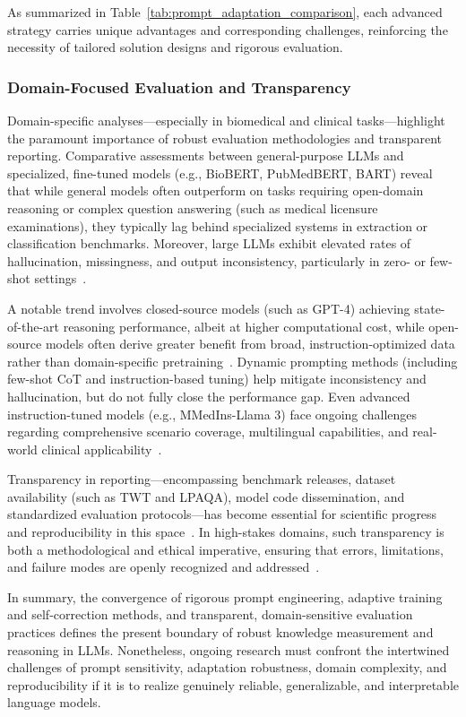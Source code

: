 \documentclass[sigconf]{acmart}
\begin{document}
As summarized in Table~\ref{tab:prompt_adaptation_comparison}, each advanced strategy carries unique advantages and corresponding challenges, reinforcing the necessity of tailored solution designs and rigorous evaluation.

\subsubsection{Domain-Focused Evaluation and Transparency}

Domain-specific analyses---especially in biomedical and clinical tasks---highlight the paramount importance of robust evaluation methodologies and transparent reporting. Comparative assessments between general-purpose LLMs and specialized, fine-tuned models (e.g., BioBERT, PubMedBERT, BART) reveal that while general models often outperform on tasks requiring open-domain reasoning or complex question answering (such as medical licensure examinations), they typically lag behind specialized systems in extraction or classification benchmarks. Moreover, large LLMs exhibit elevated rates of hallucination, missingness, and output inconsistency, particularly in zero- or few-shot settings~\cite{ref94,ref95}.

A notable trend involves closed-source models (such as GPT-4) achieving state-of-the-art reasoning performance, albeit at higher computational cost, while open-source models often derive greater benefit from broad, instruction-optimized data rather than domain-specific pretraining~\cite{ref94}. Dynamic prompting methods (including few-shot CoT and instruction-based tuning) help mitigate inconsistency and hallucination, but do not fully close the performance gap. Even advanced instruction-tuned models (e.g., MMedIns-Llama 3) face ongoing challenges regarding comprehensive scenario coverage, multilingual capabilities, and real-world clinical applicability~\cite{ref95}.

Transparency in reporting---encompassing benchmark releases, dataset availability (such as TWT and LPAQA), model code dissemination, and standardized evaluation protocols---has become essential for scientific progress and reproducibility in this space~\cite{ref96,ref98,ref95}. In high-stakes domains, such transparency is both a methodological and ethical imperative, ensuring that errors, limitations, and failure modes are openly recognized and addressed~\cite{ref94,ref95,ref96,ref98}.

In summary, the convergence of rigorous prompt engineering, adaptive training and self-correction methods, and transparent, domain-sensitive evaluation practices defines the present boundary of robust knowledge measurement and reasoning in LLMs. Nonetheless, ongoing research must confront the intertwined challenges of prompt sensitivity, adaptation robustness, domain complexity, and reproducibility if it is to realize genuinely reliable, generalizable, and interpretable language models.
\end{document}
